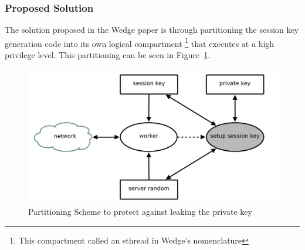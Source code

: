 \documentclass[../main.tex]{subfiles}
\begin{document}
\subsubsection*{Proposed Solution} 
The solution proposed in the Wedge paper is through partitioning the session key
generation code into its own logical compartment \footnote{This compartment
called an sthread in Wedge's nomenclature} that executes at a high privilege
level. This partitioning can be seen in Figure~\ref{fig:wedge-partition}.

\begin{figure}[H]
	\centering
	\includegraphics[scale=0.25]{images/compartment_01.png}
	\caption{Partitioning Scheme to protect against leaking the private 
	key~\cite{Bittau08}}
	\label{fig:wedge-partition}
\end{figure}
\end{document}
